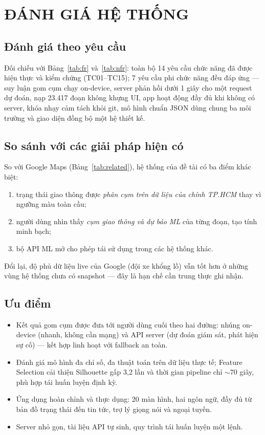 \chapter{ĐÁNH GIÁ HỆ THỐNG}

\section{Đánh giá theo yêu cầu}
Đối chiếu với Bảng~\ref{tab:fr} và~\ref{tab:nfr}: toàn bộ 14 yêu cầu chức năng đã được hiện thực và kiểm chứng (TC01--TC15); 7 yêu cầu phi chức năng đều đáp ứng --- suy luận gom cụm chạy on-device, server phản hồi dưới 1 giây cho một request dự đoán, nạp 23.417 đoạn không khựng UI, app hoạt động đầy đủ khi không có server, khóa nhạy cảm tách khỏi git, mô hình chuẩn JSON dùng chung ba môi trường và giao diện đồng bộ một hệ thiết kế.

\section{So sánh với các giải pháp hiện có}
So với Google Maps (Bảng~\ref{tab:related}), hệ thống của đề tài có ba điểm khác biệt:
\begin{enumerate}[label=(\roman*),leftmargin=2.2cm,itemsep=2pt]
 \item trạng thái giao thông được \textit{phân cụm trên dữ liệu của chính TP.HCM} thay vì ngưỡng màu toàn cầu;
 \item người dùng nhìn thấy \textit{cụm giao thông và dự báo ML} của từng đoạn, tạo tính minh bạch;
 \item bộ API ML mở cho phép tái sử dụng trong các hệ thống khác.
\end{enumerate}
Đổi lại, độ phủ dữ liệu live của Google (đội xe khổng lồ) vẫn tốt hơn ở những vùng hệ thống chưa có snapshot --- đây là hạn chế cần trung thực ghi nhận.

\section{Ưu điểm}
\begin{itemize}[nosep]
 \item Kết quả gom cụm được đưa tới người dùng cuối theo hai đường: nhúng on-device (nhanh, không cần mạng) và API server (dự đoán giám sát, phát hiện sự cố) --- kết hợp linh hoạt với fallback an toàn.
 \item Đánh giá mô hình đa chỉ số, đa thuật toán trên dữ liệu thực tế; Feature Selection cải thiện Silhouette gấp 3,2 lần và thời gian pipeline chỉ $\sim$70 giây, phù hợp tái huấn luyện định kỳ.
 \item Ứng dụng hoàn chỉnh và thực dụng: 20 màn hình, hai ngôn ngữ, đầy đủ từ bản đồ trạng thái đến tin tức, trợ lý giọng nói và ngoại tuyến.
 \item Server nhỏ gọn, tài liệu API tự sinh, quy trình tái huấn luyện một lệnh.
\end{itemize}

